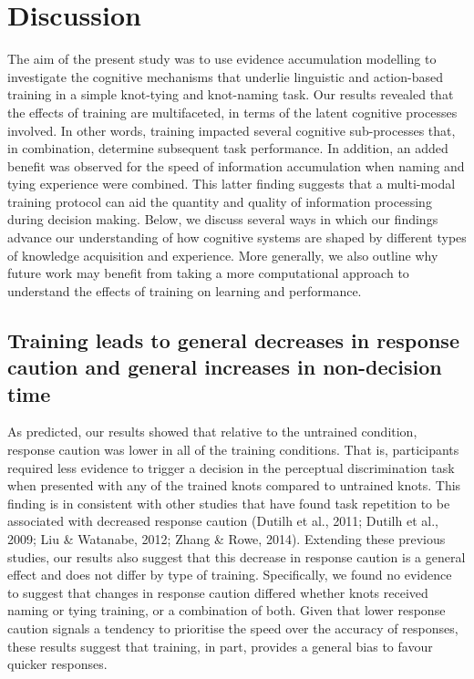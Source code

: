\documentclass[
  man, donotrepeattitle,floatsintext]{apa6}
\begin{document}
\section{Discussion}\label{discussion}

The aim of the present study was to use evidence accumulation modelling to investigate the cognitive mechanisms that underlie linguistic and action-based training in a simple knot-tying and knot-naming task. Our results revealed that the effects of training are multifaceted, in terms of the latent cognitive processes involved. In other words, training impacted several cognitive sub-processes that, in combination, determine subsequent task performance. In addition, an added benefit was observed for the speed of information accumulation when naming and tying experience were combined. This latter finding suggests that a multi-modal training protocol can aid the quantity and quality of information processing during decision making. Below, we discuss several ways in which our findings advance our understanding of how cognitive systems are shaped by different types of knowledge acquisition and experience. More generally, we also outline why future work may benefit from taking a more computational approach to understand the effects of training on learning and performance.

\subsection{Training leads to general decreases in response caution and general increases in non-decision time}\label{training-leads-to-general-decreases-in-response-caution-and-general-increases-in-non-decision-time}

As predicted, our results showed that relative to the untrained condition, response caution was lower in all of the training conditions. That is, participants required less evidence to trigger a decision in the perceptual discrimination task when presented with any of the trained knots compared to untrained knots. This finding is in consistent with other studies that have found task repetition to be associated with decreased response caution (Dutilh et al., 2011; Dutilh et al., 2009; Liu \& Watanabe, 2012; Zhang \& Rowe, 2014). Extending these previous studies, our results also suggest that this decrease in response caution is a general effect and does not differ by type of training. Specifically, we found no evidence to suggest that changes in response caution differed whether knots received naming or tying training, or a combination of both. Given that lower response caution signals a tendency to prioritise the speed over the accuracy of responses, these results suggest that training, in part, provides a general bias to favour quicker responses.
\end{document}
